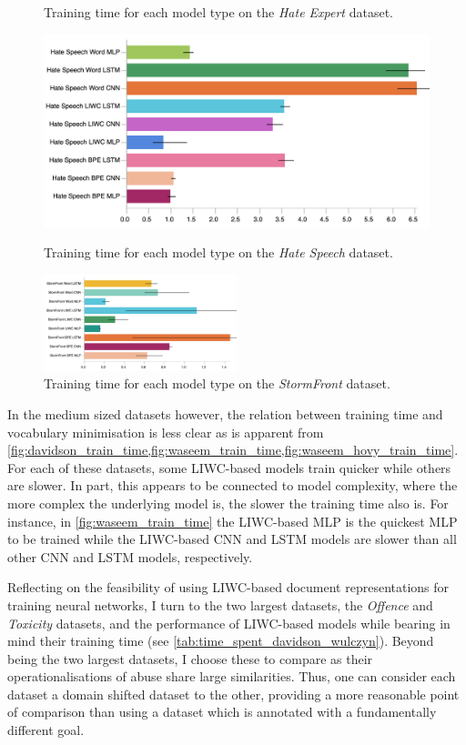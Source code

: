 \begin{figure}[h]
\begin{minipage}{0.49\textwidth}
    \caption{Training time for each model type on the \textit{Hate Expert} dataset.}
    \label{fig:waseem_train_time}
    \vfill
    \includegraphics[width=\textwidth]{waseem_hovy_train_time.pdf}
    \caption{Training time for each model type on the \textit{Hate Speech} dataset.}
    \label{fig:waseem_hovy_train_time}
  \end{minipage}
  \vfill
  \centering
  \includegraphics[width=0.50\textwidth]{garcia_train_time.pdf}
  \caption{Training time for each model type on the \textit{StormFront} dataset.}
  \label{fig:garcia_train_time}
\end{figure}

In the medium sized datasets however, the relation between training time and vocabulary minimisation is less clear as is apparent from \cref{fig:davidson_train_time,fig:waseem_train_time,fig:waseem_hovy_train_time}. For each of these datasets, some LIWC-based models train quicker while others are slower. In part, this appears to be connected to model complexity, where the more complex the underlying model is, the slower the training time also is. For instance, in  \cref{fig:waseem_train_time} the LIWC-based MLP is the quickest MLP to be trained while the LIWC-based CNN and LSTM models are slower than all other CNN and LSTM models, respectively.


Reflecting on the feasibility of using LIWC-based document representations for training neural networks, I turn to the two largest datasets, the \textit{Offence} and \textit{Toxicity} datasets, and the performance of LIWC-based models while bearing in mind their training time (see \cref{tab:time_spent_davidson_wulczyn}). Beyond being the two largest datasets, I choose these to compare as their operationalisations of abuse share large similarities. Thus, one can consider each dataset a domain shifted dataset to the other, providing a more reasonable point of comparison than using a dataset which is annotated with a fundamentally different goal.


